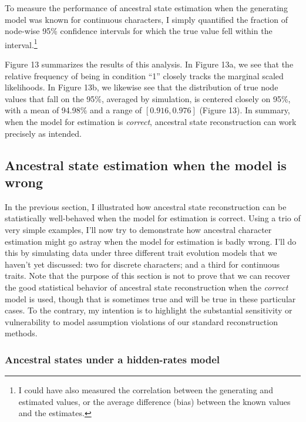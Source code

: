 \documentclass{article}
\begin{document}
To measure the performance of ancestral state estimation when the generating model was known for continuous characters, I simply quantified the fraction of node-wise 95\% confidence intervals for which the true value fell within the interval.\footnote{I could have also measured the correlation between the generating and estimated values, or the average difference (bias) between the known values and the estimates.}

Figure 13 summarizes the results of this analysis. In Figure 13a, we see that the relative frequency of being in condition ``1'' closely tracks the marginal scaled likelihoods. In Figure 13b, we likewise see that the distribution of true node values that fall on the 95\%, averaged by simulation, is centered closely on 95\%, with a mean of 94.98\% and a range of \([0.916, 0.976]\) (Figure 13). In summary, when the model for estimation is \emph{correct}, ancestral state reconstruction can work precisely as intended.

\subsection{Ancestral state estimation when the model is wrong}\label{ancestral-state-estimation-when-the-model-is-wrong}

In the previous section, I illustrated how ancestral state reconstruction can be statistically well-behaved when the model for estimation is correct. Using a trio of very simple examples, I'll now try to demonstrate how ancestral character estimation might go astray when the model for estimation is badly wrong. I'll do this by simulating data under three different trait evolution models that we haven't yet discussed: two for discrete characters; and a third for continuous traits. Note that the purpose of this section is not to prove that we can recover the good statistical behavior of ancestral state reconstruction when the \emph{correct} model is used, though that is sometimes true and will be true in these particular cases. To the contrary, my intention is to highlight the substantial sensitivity or vulnerability to model assumption violations of our standard reconstruction methods.

\subsubsection{Ancestral states under a hidden-rates model}\label{ancestral-states-under-a-hidden-rates-model}
\end{document}
